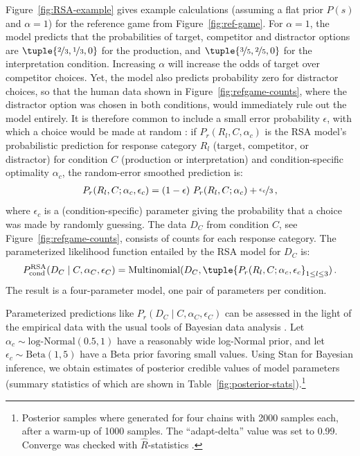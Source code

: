 \documentclass[fleqn]{article}
\begin{document}
Figure~\ref{fig:RSA-example} gives example calculations (assuming a flat prior $P(s)$ and $\alpha=1$) for the reference game from Figure~\ref{fig:ref-game}.
For $\alpha=1$, the model predicts that the probabilities of target, competitor and distractor options are $\tuple{\nicefrac{2}{3}, \nicefrac{1}{3}, 0}$ for the production, and $\tuple{\nicefrac{3}{5}, \nicefrac{2}{5}, 0}$ for the interpretation condition.
Increasing $\alpha$ will increase the odds of target over competitor choices.
Yet, the model also predicts probability zero for distractor choices, so that the human data shown in Figure~\ref{fig:refgame-counts}, where the distractor option was chosen in both conditions, would immediately rule out the model entirely.
It is therefore common to include a small error probability $\epsilon$, with which a choice would be made at random \citep[e.g.,][]{LeeWagenmakers2013:Bayesian-Cognit}: if $P_{r}(R_{l}, C, \alpha_{c})$ is the RSA model's probabilistic prediction for response category $R_{l}$ (target, competitor, or distractor) for condition $C$ (production or interpretation) and condition-specific optimality $\alpha_{c}$, the random-error smoothed prediction is:
\begin{align*}
  P_{r}(R_{l}, C; \alpha_{c}, \epsilon_{c}) = (1 - \epsilon) \  P_{r}(R_{l}, C; \alpha_{c}) +  \nicefrac{\epsilon_{c}}{3}\,,
\end{align*}
where $\epsilon_{c}$ is a (condition-specific) parameter giving the probability that a choice was made by randomly guessing.
The data $D_{C}$ from condition $C$, see Figure~\ref{fig:refgame-counts}, consists of counts for each response category.
The parameterized likelihood function entailed by the RSA model for $D_{C}$ is:
%
\begin{align*}
 P^{\text{RSA}}_{\text{cond}}(D_{C} \mid C, \alpha_{C}, \epsilon_{C}) = \text{Multinomial}(D_{C}, \tuple{P_{r}(R_{l}, C; \alpha_{c}, \epsilon_{c}}_{1 \le l \le 3})\,.
\end{align*}
%
The result is a four-parameter model, one pair of parameters per condition.

Parameterized predictions like $P_{r}(D_{C} \mid C, \alpha_{C}, \epsilon_{C})$ can be assessed in the light of the empirical data with the usual tools of Bayesian data analysis \citep[e.g.][]{GelmanCarlin2014:Bayesian-Data-A,McElreath2016:Statistical-Ret,Lambert2018:A-Students-Guid}.
Let $\alpha_{c}\sim \text{log-Normal}(0.5,1)$ have a reasonably wide log-Normal prior, and let $\epsilon_{c} \sim \text{Beta}(1,5)$ have a Beta prior favoring small values.
Using Stan \citep{Team2023:The-Stan-Core-L} for Bayesian inference, we obtain estimates of posterior credible values of model parameters (summary statistics of which are shown in Table~\ref{fig:posterior-stats}).\footnote{
  Posterior samples where generated for four chains with 2000 samples each, after a warm-up of 1000 samples. The ``adapt-delta'' value was set to 0.99. Converge was checked with $\hat{R}$-statistics \citep{GelmanRubin1992:Inference-from-}.
}
\end{document}
